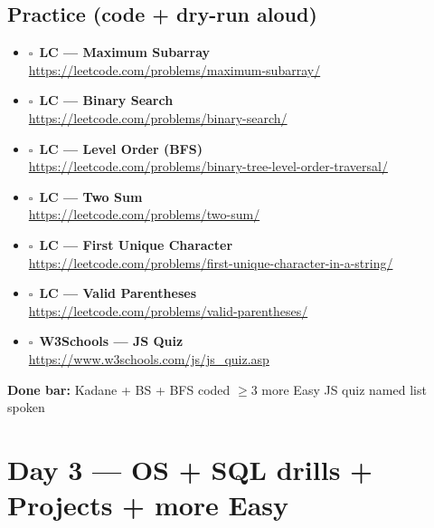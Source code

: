 \documentclass[a4paper,9pt]{extarticle}
\newcommand{\tick}{$\square$\ }
\newcommand{\Res}[2]{\textbf{#1}\\{\footnotesize\url{#2}}}
\begin{document}
\subsection{Practice (code + dry-run aloud)}
\begin{itemize}
  \item \tick \Res{LC --- Maximum Subarray}{https://leetcode.com/problems/maximum-subarray/}
  \item \tick \Res{LC --- Binary Search}{https://leetcode.com/problems/binary-search/}
  \item \tick \Res{LC --- Level Order (BFS)}{https://leetcode.com/problems/binary-tree-level-order-traversal/}
  \item \tick \Res{LC --- Two Sum}{https://leetcode.com/problems/two-sum/}
  \item \tick \Res{LC --- First Unique Character}{https://leetcode.com/problems/first-unique-character-in-a-string/}
  \item \tick \Res{LC --- Valid Parentheses}{https://leetcode.com/problems/valid-parentheses/}
  \item \tick \Res{W3Schools --- JS Quiz}{https://www.w3schools.com/js/js_quiz.asp}
\end{itemize}

\noindent\textbf{Done bar:} Kadane + BS + BFS coded \textbar{} $\geq$3 more Easy \textbar{} JS quiz \textbar{} named list spoken

\section{Day 3 --- OS + SQL drills + Projects + more Easy}
\end{document}
